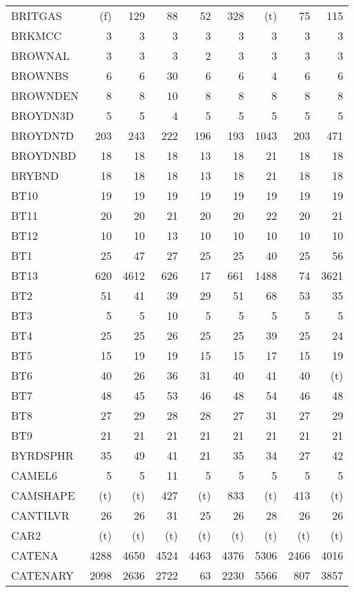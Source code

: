 \documentclass[11pt,twoside]{article}
\begin{document}
{\begin{longtable}[c]{|l|r|r|r|r|r|r|r|r|}
 BRITGAS & (f) & 129 & 88 & 52 & 328 & (t) & 75 & 115 \\
 BRKMCC & 3 & 3 & 3 & 3 & 3 & 3 & 3 & 3 \\
 BROWNAL & 3 & 3 & 3 & 2 & 3 & 3 & 3 & 3 \\
 BROWNBS & 6 & 6 & 30 & 6 & 6 & 4 & 6 & 6 \\
 BROWNDEN & 8 & 8 & 10 & 8 & 8 & 8 & 8 & 8 \\
 BROYDN3D & 5 & 5 & 4 & 5 & 5 & 5 & 5 & 5 \\
 BROYDN7D & 203 & 243 & 222 & 196 & 193 & 1043 & 203 & 471 \\
 BROYDNBD & 18 & 18 & 18 & 13 & 18 & 21 & 18 & 18 \\
 BRYBND & 18 & 18 & 18 & 13 & 18 & 21 & 18 & 18 \\
 BT10 & 19 & 19 & 19 & 19 & 19 & 19 & 19 & 19 \\
 BT11 & 20 & 20 & 21 & 20 & 20 & 22 & 20 & 21 \\
 BT12 & 10 & 10 & 13 & 10 & 10 & 10 & 10 & 10 \\
 BT1 & 25 & 47 & 27 & 25 & 25 & 40 & 25 & 56 \\
 BT13 & 620 & 4612 & 626 & 17 & 661 & 1488 & 74 & 3621 \\
 BT2 & 51 & 41 & 39 & 29 & 51 & 68 & 53 & 35 \\
 BT3 & 5 & 5 & 10 & 5 & 5 & 5 & 5 & 5 \\
 BT4 & 25 & 25 & 26 & 25 & 25 & 39 & 25 & 24 \\
 BT5 & 15 & 19 & 19 & 15 & 15 & 17 & 15 & 19 \\
 BT6 & 40 & 26 & 36 & 31 & 40 & 41 & 40 & (t) \\
 BT7 & 48 & 45 & 53 & 46 & 48 & 54 & 46 & 48 \\
 BT8 & 27 & 29 & 28 & 28 & 27 & 31 & 27 & 29 \\
 BT9 & 21 & 21 & 21 & 21 & 21 & 21 & 21 & 21 \\
 BYRDSPHR & 35 & 49 & 41 & 21 & 35 & 34 & 27 & 42 \\
 CAMEL6 & 5 & 5 & 11 & 5 & 5 & 5 & 5 & 5 \\
 CAMSHAPE & (t) & (t) & 427 & (t) & 833 & (t) & 413 & (t) \\
 CANTILVR & 26 & 26 & 31 & 25 & 26 & 28 & 26 & 26 \\
 CAR2 & (t) & (t) & (t) & (t) & (t) & (t) & (t) & (t) \\
 CATENA & 4288 & 4650 & 4524 & 4463 & 4376 & 5306 & 2466 & 4016 \\
 CATENARY & 2098 & 2636 & 2722 & 63 & 2230 & 5566 & 807 & 3857 \\

\end{longtable}}
\end{document}
